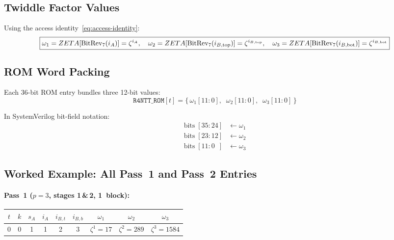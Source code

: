 \documentclass[11pt,a4paper]{article}
\newcommand{\brev}[1]{\operatorname{BitRev}_{7}\!\left(#1\right)}
\begin{document}
\subsection{Twiddle Factor Values}

Using the access identity~\eqref{eq:access-identity}:
\begin{equation}
  \boxed{%
    \omega_1 = ZETA\!\left[\brev{i_A}\right] = \zeta^{i_A},\quad
    \omega_2 = ZETA\!\left[\brev{i_{B,\text{top}}}\right] = \zeta^{i_{B,\text{top}}},\quad
    \omega_3 = ZETA\!\left[\brev{i_{B,\text{bot}}}\right] = \zeta^{i_{B,\text{bot}}}
  }
  \label{eq:r4ntt-twiddles}
\end{equation}

\subsection{ROM Word Packing}

Each 36-bit ROM entry bundles three 12-bit values:
\[
  \texttt{R4NTT\_ROM}[t] = \bigl\{\,\omega_1[11\!:\!0],\;\; \omega_2[11\!:\!0],\;\; \omega_3[11\!:\!0]\,\bigr\}
\]

In SystemVerilog bit-field notation:
\begin{align*}
  \text{bits}\;[35\!:\!24] &\leftarrow \omega_1 \\
  \text{bits}\;[23\!:\!12] &\leftarrow \omega_2 \\
  \text{bits}\;[11\!:\!0\phantom{0}]  &\leftarrow \omega_3
\end{align*}

\subsection{Worked Example: All Pass~1 and Pass~2 Entries}

\paragraph{Pass~1 ($p=3$, stages 1\,\&\,2, 1~block):}

\begin{center}
\begin{tabular}{ccccccccc}
\toprule
$t$ & $k$ & $s_A$ & $i_A$ & $i_{B,t}$ & $i_{B,b}$ & $\omega_1$ & $\omega_2$ & $\omega_3$ \\
\midrule
0 & 0 & 1 & 1 & 2 & 3 & $\zeta^1 = 17$ & $\zeta^2 = 289$ & $\zeta^3 = 1584$ \\
\bottomrule
\end{tabular}
\end{center}
\end{document}
